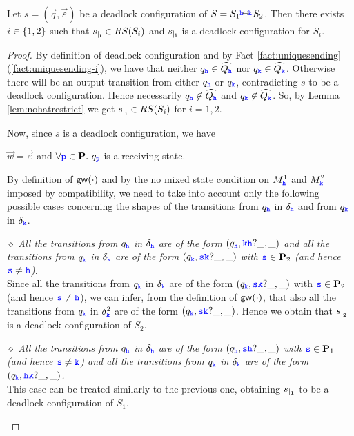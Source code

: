 \begin{lemma}%
\label{lem:weakdfpreservation}
Let $s= (\vec{q},\vec{\varepsilon})$ be a deadlock configuration of $S={S_{1}}\connect{\HH}{\KK} {S_{2}}$.
Then there exists $i\in\Set{1,2}$ such that $\restrict{s}{i}\in RS(S_i)$ and $\restrict{s}{i}$ is a deadlock configuration for $S_i$.
\end{lemma}

\begin{proof}
By definition of deadlock configuration and by Fact \ref{fact:uniquesending}(\ref{fact:uniquesending-i}), we have that
neither $q_\HH\in\widehat{Q_\HH}$ nor $q_\KK\in\widehat{Q_\KK}$. Otherwise
there will be an output transition from either $q_\HH$ or  $q_\KK$, contradicting $s$ to be a deadlock configuration.
Hence necessarily $q_\HH\not\in\widehat{Q_\HH}$ and $q_\KK\not\in\widehat{Q_\KK}$. 
So, by Lemma \ref{lem:nohatrestrict} we get $\restrict{s}{i}\in RS(S_i)$ for $i=1,2$.

Now, since $s$ is a deadlock configuration, we have \\
\centerline{$\vec{w}=\vec{\varepsilon}$ and 
$\forall \ttp\in\roles.~q_\ttp$  is a receiving state.}
By definition of $\gateway{\cdot}$ and by the no mixed state condition on $M^1_\HH$ and $M^2_\KK$
imposed by compatibility,  we need  to 
take into account only the following possible cases concerning the shapes of the transitions from  $q_\HH$  in $\delta_\HH$ and from  $q_\KK$ in $\delta_\KK$.

\begin{description}
\item
\underline{$\diamond$} 
{\em  All the transitions from $q_\HH$ in $\delta_\HH$ are of the form $(q_\HH,\KK\HH?\_,\_)$ and
all the transitions from $q_\KK$ in $\delta_\KK$ are of the form $(q_\KK,\tts\KK?\_,\_)$ with $\tts \in \roles_2$ (and hence $\tts\neq\HH$).}\\
Since all the transitions from $q_\KK$ in $\delta_\KK$ are of the form $(q_\KK,\tts\KK?\_,\_)$ with $\tts \in \roles_2$ (and hence $\tts\neq\HH$),
  we can infer, from the definition of  $\gateway{\cdot}$, that also  all the transitions from $q_\KK$ in $\delta^2_\KK$ are of the form $(q_\KK,\tts\KK?\_,\_)$. Hence we obtain that $\restrict{s}{2}$ is a deadlock configuration of $S_2$.
  
\item
\underline{$\diamond$} 
{\em All the transitions from $q_\HH$ in $\delta_\HH$ are of the form $(q_\HH,\tts\HH?\_,\_)$ with $\tts \in \roles_1$ (and hence $\tts\neq\KK$) and
all the transitions from $q_\KK$ in $\delta_\KK$ are of the form $(q_\KK,\HH\KK?\_,\_)$.}\\
This case can be treated similarly to the previous one, obtaining  $\restrict{s}{1}$ to be a deadlock configuration of $S_1$.


\end{description}
\end{proof}
